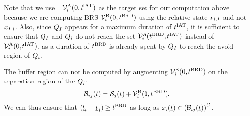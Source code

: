 Note that we use $-\mathcal{V}^{\text{A}}_{i}(0, t^\text{IAT})$ as the target set for our computation above because we are computing BRS $\mathcal{V}^{\text{B}}_{i}(0, t^\text{BRD})$ using the relative state $x_{i, I}$ and not $x_{I, i}$. Also, since $Q_{I}$ appears for a maximum duration of $t^\text{IAT}$, it is sufficient to ensure that $Q_{I}$ and $Q_i$ do not reach the set $\mathcal{V}^{\text{A}}_{i}(t^\text{BRD}, t^\text{IAT})$ instead of $\mathcal{V}^{\text{A}}_{i}(0, t^\text{IAT})$, as a duration of $t^\text{BRD}$ is already spent by $Q_{I}$ to reach the avoid region of $Q_i$.

The buffer region can not be computed by augmenting $\mathcal{V}^{\text{B}}_{i}(0, t^\text{BRD})$ on the separation region of the $Q_j$:
\begin{equation} \label{eqn:buffRegion_case1}
\buff_{ij}(\tsa) = \sep_j(\tsa) + \brs^{\text{B}}_{i}(0, \brd).
\end{equation} 
We can thus ensure that $(\underline{t}_i - \underline{t}_j) \geq t^\text{BRD}$ as long as $x_i(\underline{t}) \in \left(\mathcal{B}_{ij}(\underline{t})\right)^C$.